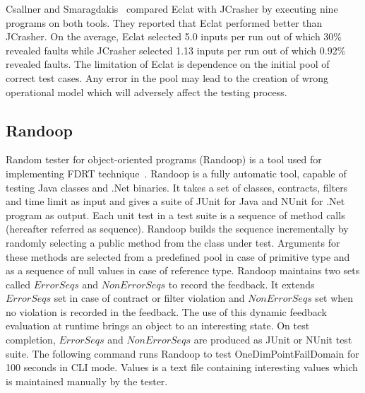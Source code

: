 Csallner and Smaragdakis~\cite{csallner2004jcrasher} compared Eclat with JCrasher by executing nine programs on  both tools. They reported that Eclat performed better than JCrasher. On the average, Eclat selected 5.0 inputs per run out of which 30\% revealed faults while JCrasher selected 1.13 inputs per run out of which 0.92\% revealed faults. The limitation of Eclat is dependence on the initial pool of correct test cases. Any error in the pool may lead to the creation of wrong operational model which will adversely affect the testing process.   



\subsection{Randoop} \label{sec:Randoop}
Random tester for object-oriented programs (Randoop) is a tool used for implementing FDRT technique~\cite{pacheco2007randoop}. Randoop is a fully automatic tool, capable of testing Java classes and .Net binaries. It takes a set of classes, contracts, filters and time limit as input and gives a suite of JUnit for Java and NUnit for .Net program as output. Each unit test in a test suite is a sequence of method calls (hereafter referred as sequence). Randoop builds the sequence incrementally by randomly selecting a public method from the class under test.  Arguments for these methods are selected from a predefined pool in case of primitive type and as a sequence of null values in case of reference type. Randoop maintains two sets called $ErrorSeqs$ and $NonErrorSeqs$ to record the feedback. It extends $ErrorSeqs$ set in case of contract or filter violation and $NonErrorSeqs$ set when no violation is recorded in the feedback. The use of this dynamic feedback evaluation at runtime brings an object to an interesting state. On test completion, $ErrorSeqs$ and $NonErrorSeqs$ are produced as JUnit or NUnit test suite. The following command runs Randoop to test OneDimPointFailDomain for 100 seconds in CLI mode. Values is a text file containing interesting values which is maintained manually by the tester.

